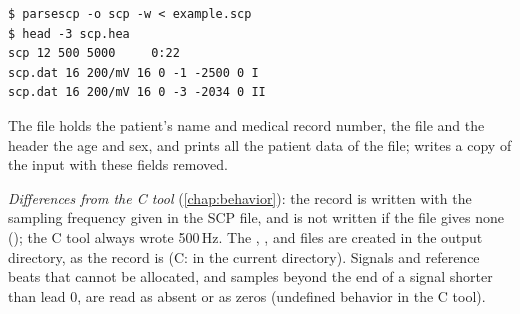 \begin{lstlisting}[style=text]
$ parsescp -o scp -w < example.scp
$ head -3 scp.hea
scp 12 500 5000     0:22
scp.dat 16 200/mV 16 0 -1 -2500 0 I
scp.dat 16 200/mV 16 0 -3 -2034 0 II
\end{lstlisting}
\begin{phibox}
The  file holds the patient's name and medical record number, the 
file and the header the age and sex, and  prints all the patient data of the file;
 writes a copy of the input with these fields removed.
\end{phibox}
\textit{Differences from the C tool} (\cref{chap:behavior}): the record is written with the
sampling frequency given in the SCP file, and is not written if the file gives none
(); the C tool
always wrote 500\,Hz. The , ,  and  files are
created in the output directory, as the record is (C: in the current directory). Signals and
reference beats that cannot be allocated, and samples
beyond the end of a signal shorter than lead 0, are read as absent or as zeros (undefined
behavior in the C tool).
